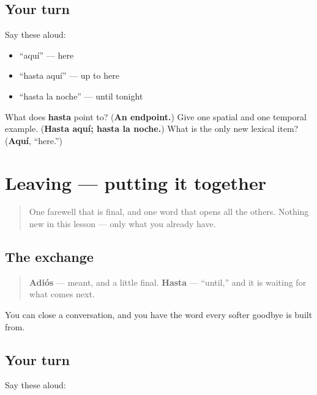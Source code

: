 \subsection*{Your turn}
Say these aloud:

\begin{itemize}
\raggedright
  \item “aquí” — here
  \item “hasta aquí” — up to here
  \item “hasta la noche” — until tonight
\end{itemize}

\begin{tcolorbox}[breakable,colback=teal!4,colframe=teal!35!black,title={Before you move on}]
What does \textbf{hasta} point to? (\textbf{An endpoint.}) Give one spatial and one temporal example. (\textbf{Hasta aquí; hasta la noche.}) What is the only new lexical item? (\textbf{Aquí}, “here.”)
\end{tcolorbox}
\section[Practice]{Leaving — putting it together}

\label{lesson:ES-C05-repaso-adios}



\begin{quote}
One farewell that is final, and one word that opens all the others. Nothing new in this lesson — only what you already have.
\end{quote}

\subsection*{The exchange}
\begin{quote}
\textbf{Adiós} — meant, and a little final. \textbf{Hasta} — \textquotedblleft{}until,\textquotedblright{} and it is waiting for what comes next.
\end{quote}

\begin{grammarlens}[title={What you've built}]
You can close a conversation, and you have the word every softer goodbye is built from.
\end{grammarlens}

\subsection*{Your turn}
Say these aloud:

